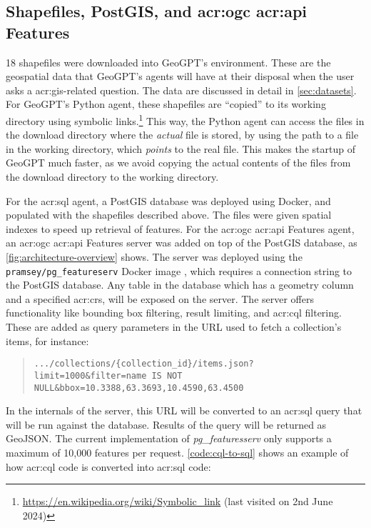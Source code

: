 \subsection[Shapefiles, PostGIS, and OGC API Features]{Shapefiles, PostGIS, and \acrshort{acr:ogc} \acrshort{acr:api} Features}
\label{subsec:postgis-and-oaf-architecture}

18 shapefiles were downloaded into GeoGPT's environment. These are the geospatial data that GeoGPT's agents will have at their disposal when the user asks a \acrshort{acr:gis}-related question. The data are discussed in detail in \autoref{sec:datasets}. For GeoGPT's Python agent, these shapefiles are \enquote{copied} to its working directory using symbolic links.\footnote{\url{https://en.wikipedia.org/wiki/Symbolic_link} (last visited on 2nd June 2024)} This way, the Python agent can access the files in the download directory where the \textit{actual} file is stored, by using the path to a file in the working directory, which \textit{points} to the real file. This makes the startup of GeoGPT much faster, as we avoid copying the actual contents of the files from the download directory to the working directory.

For the \acrshort{acr:sql} agent, a PostGIS database was deployed using Docker, and populated with the shapefiles described above. The files were given spatial indexes to speed up retrieval of features. For the \acrshort{acr:ogc} \acrshort{acr:api} Features agent,  an \acrshort{acr:ogc} \acrshort{acr:api} Features server was added on top of the PostGIS database, as \autoref{fig:architecture-overview} shows. The server was deployed using the \texttt{pramsey/pg\_featureserv} Docker image \citep{crunchydataCrunchyDataPg_featureserv2024}, which requires a connection string to the PostGIS database. Any table in the database which has a geometry column and a specified \gls{acr:crs}, will be exposed on the server. The server offers functionality like bounding box filtering, result limiting, and \acrshort{acr:cql} filtering. These are added as query parameters in the URL used to fetch a collection's items, for instance:

\begin{quote}
    \texttt{.../collections/\{collection\_id\}/items.json?limit=1000\&filter=name IS NOT NULL\&bbox=10.3388,63.3693,10.4590,63.4500}
\end{quote}

In the internals of the server, this URL will be converted to an \acrshort{acr:sql} query that will be run against the database. Results of the query will be returned as GeoJSON. The current implementation of \textit{pg\_featuresserv} only supports a maximum of 10,000 features per request. \autoref{code:cql-to-sql} shows an example of how \acrshort{acr:cql} code is converted into \acrshort{acr:sql} code:

